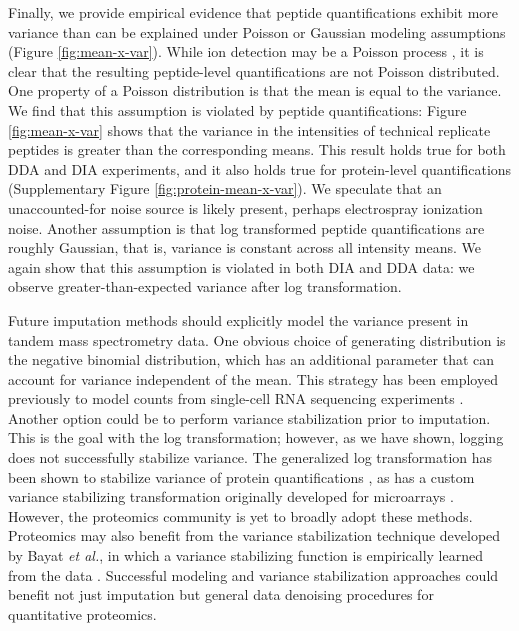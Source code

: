 \documentclass{article}
\begin{document}
Finally, we provide empirical evidence that peptide quantifications exhibit more variance than can be explained under Poisson or Gaussian modeling assumptions (Figure \ref{fig:mean-x-var}). While ion detection may be a Poisson process \cite{ms-dist-derivation, stat-theory-lcms, kimmel-2005}, it is clear that the resulting peptide-level quantifications are not Poisson distributed. One property of a Poisson distribution is that the mean is equal to the variance. We find that this assumption is violated by peptide quantifications: Figure \ref{fig:mean-x-var} shows that the variance in the intensities of technical replicate peptides is greater than the corresponding means. This result holds true for both DDA and DIA experiments, and it also holds true for protein-level quantifications (Supplementary Figure \ref{fig:protein-mean-x-var}). We speculate that an unaccounted-for noise source is likely present, perhaps electrospray ionization noise. Another assumption is that log transformed peptide quantifications are roughly Gaussian, that is, variance is constant across all intensity means. We again show that this assumption is violated in both DIA and DDA data: we observe greater-than-expected variance after log transformation. 

Future imputation methods should explicitly model the variance present in tandem mass spectrometry data. One obvious choice of generating distribution is the negative binomial distribution, which has an additional parameter that can account for variance independent of the mean. This strategy has been employed previously to model counts from single-cell RNA sequencing experiments \cite{ZINB, neg-binom-scRNAseq}. Another option could be to perform variance stabilization prior to imputation. This is the goal with the log transformation; however, as we have shown, logging does not successfully stabilize variance. The generalized log transformation has been shown to stabilize variance of protein quantifications \cite{ms-noise-2-component}, as has a custom variance stabilizing transformation originally developed for microarrays \cite{variance-stable-microarray}. However, the proteomics community is yet to broadly adopt these methods. Proteomics may also benefit from the variance stabilization technique developed by Bayat \textit{et al.}, in which a variance stabilizing function is empirically learned from the data \cite{variance-stable}. Successful modeling and variance stabilization approaches could benefit not just imputation but general data denoising procedures for quantitative proteomics.  
\end{document}
